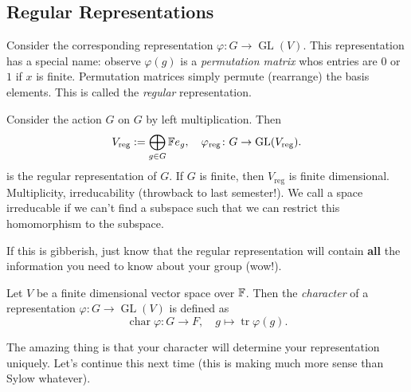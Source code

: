 \subsection{Regular Representations}
\begin{definition}
Consider the corresponding representation $\varphi \colon G \to \operatorname{GL}(V)$. This representation has a special name: observe $\varphi (g)$ is a \emph{permutation matrix}  whos entries are $0$ or $1$ if $x$ is finite. Permutation matrices simply permute (rearrange) the basis elements. This is called the \emph{regular} representation.
\end{definition}
\begin{example}
    Consider the action $G$ on $G$ by left multiplication. Then \[
        V_{\text{reg}}:=\bigoplus_{g\in G}\mathbb{F} e_g, \quad \varphi _{\text{reg}} \colon G \to \operatorname{GL}(V_{\text{reg}}).
    \] is the regular representation of $G$. If $G$ is finite, then $V_{\text{reg}}$ is finite dimensional. Multiplicity, irreducability (throwback to last semester!). We call a space irreducable if we can't find a subspace such that we can restrict this homomorphism to the subspace.

    If this is gibberish, just know that the regular representation will contain \textbf{all} the information you need to know about your group (wow!).
\end{example}
\begin{definition}
    Let $V$ be a finite dimensional vector space over $\mathbb{F}$. Then the \emph{character} of a representation $\varphi \colon G \to \operatorname{GL}(V)$ is defined as \[
        \operatorname{char}\varphi  \colon G \to F,\quad g\mapsto \operatorname{tr}\varphi (g).
    \] 
\end{definition}
The amazing thing is that your character will determine your representation uniquely. Let's continue this next time (this is making much more sense than Sylow whatever).

